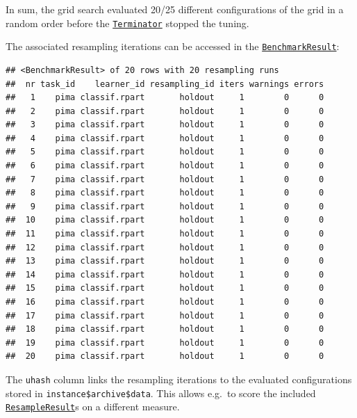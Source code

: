 \documentclass[
]{scrbook}
\newenvironment{Shaded}{\begin{snugshade}}{\end{snugshade}}
\newcommand{\NormalTok}[1]{#1}
\newcommand{\SpecialCharTok}[1]{\textcolor[rgb]{0.00,0.00,0.00}{#1}}
\renewenvironment{Shaded} {\begin{snugshade}\small} {\end{snugshade}}
\begin{document}
In sum, the grid search evaluated 20/25 different configurations of the grid in a random order before the \href{https://bbotk.mlr-org.com/reference/Terminator.html}{\texttt{Terminator}} stopped the tuning.

The associated resampling iterations can be accessed in the \href{https://mlr3.mlr-org.com/reference/BenchmarkResult.html}{\texttt{BenchmarkResult}}:

\begin{Shaded}
\end{Shaded}

\begin{verbatim}
## <BenchmarkResult> of 20 rows with 20 resampling runs
##  nr task_id    learner_id resampling_id iters warnings errors
##   1    pima classif.rpart       holdout     1        0      0
##   2    pima classif.rpart       holdout     1        0      0
##   3    pima classif.rpart       holdout     1        0      0
##   4    pima classif.rpart       holdout     1        0      0
##   5    pima classif.rpart       holdout     1        0      0
##   6    pima classif.rpart       holdout     1        0      0
##   7    pima classif.rpart       holdout     1        0      0
##   8    pima classif.rpart       holdout     1        0      0
##   9    pima classif.rpart       holdout     1        0      0
##  10    pima classif.rpart       holdout     1        0      0
##  11    pima classif.rpart       holdout     1        0      0
##  12    pima classif.rpart       holdout     1        0      0
##  13    pima classif.rpart       holdout     1        0      0
##  14    pima classif.rpart       holdout     1        0      0
##  15    pima classif.rpart       holdout     1        0      0
##  16    pima classif.rpart       holdout     1        0      0
##  17    pima classif.rpart       holdout     1        0      0
##  18    pima classif.rpart       holdout     1        0      0
##  19    pima classif.rpart       holdout     1        0      0
##  20    pima classif.rpart       holdout     1        0      0
\end{verbatim}

The \texttt{uhash} column links the resampling iterations to the evaluated configurations stored in \texttt{instance\$archive\$data}. This allows e.g.~to score the included \href{https://mlr3.mlr-org.com/reference/ResampleResult.html}{\texttt{ResampleResult}}s on a different measure.
\end{document}
